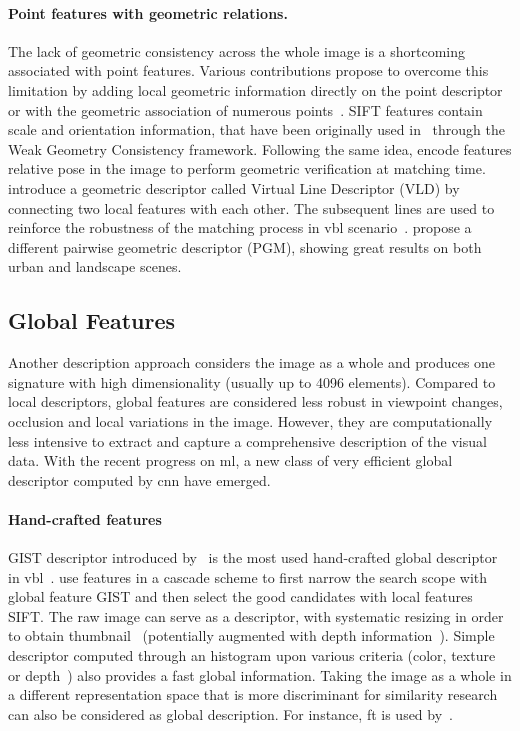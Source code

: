 		\paragraph{Point features with geometric relations.}
        	The lack of geometric consistency across the whole image is a shortcoming associated with point features. Various contributions propose to overcome this limitation by adding local geometric information directly on the point descriptor~\citep{Baatz2012,Jegou2008} or with the geometric association of numerous points~\citep{Liu2012,Li2015}. SIFT features contain scale and orientation information, that have been originally used in~\citep{Jegou2008} through the Weak Geometry Consistency framework. Following the same idea, \citet{Baatz2012} encode features relative pose in the image to perform geometric verification at matching time. \citet{Liu2012} introduce a geometric descriptor called Virtual Line Descriptor (VLD) by connecting two local features with each other. The subsequent lines are used to reinforce the robustness of the matching process in \ac{vbl} scenario~\citep{Majdik2013}. \citet{Li2015} propose a different pairwise geometric descriptor (PGM), showing great results on both urban and landscape scenes.
			
	\subsection{Global Features}
	\label{subsec:global_feature}
		Another description approach considers the image as a whole and produces one signature with high dimensionality (usually up to 4096 elements). Compared to local descriptors, global features are considered less robust in viewpoint changes, occlusion and local variations in the image. However, they are computationally less intensive to extract and capture a comprehensive description of the visual data. With the recent progress on \ac{ml}, a new class of very efficient global descriptor computed by \ac{cnn} have emerged.
		
		\paragraph{Hand-crafted features}
		 	GIST descriptor introduced by~\citet{Oliva2001} is the most used hand-crafted global descriptor in \ac{vbl}~\citep{Russell2011,Azzi2016,Hays2008}. \citet{Azzi2016} use features in a cascade scheme to first narrow the search scope with global feature GIST and then select the good candidates with local features SIFT. The raw image can serve as a descriptor, with systematic resizing in order to obtain thumbnail~\citep{Hays2008,Corke2013} (potentially augmented with depth information~\citep{Gee2012}). Simple descriptor computed through an histogram upon various criteria (color, texture~\citep{Hays2008} or depth~\citep{Ni2009}) also provides a fast global information. Taking the image as a whole in a different representation space that is more discriminant for similarity research can also be considered as global description. For instance, \ac{ft} is used by~\citet{Wan2016}.
			
